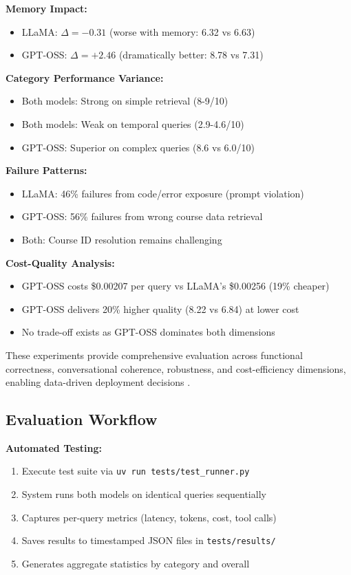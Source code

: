 \documentclass{article}
\begin{document}
\textbf{Memory Impact:}
\begin{itemize}
    \item LLaMA: $\Delta = -0.31$ (worse with memory: 6.32 vs 6.63)
    \item GPT-OSS: $\Delta = +2.46$ (dramatically better: 8.78 vs 7.31)
\end{itemize}

\textbf{Category Performance Variance:}
\begin{itemize}
    \item Both models: Strong on simple retrieval (8-9/10)
    \item Both models: Weak on temporal queries (2.9-4.6/10)
    \item GPT-OSS: Superior on complex queries (8.6 vs 6.0/10)
\end{itemize}

\textbf{Failure Patterns:}
\begin{itemize}
    \item LLaMA: 46\% failures from code/error exposure (prompt violation)
    \item GPT-OSS: 56\% failures from wrong course data retrieval
    \item Both: Course ID resolution remains challenging
\end{itemize}

\textbf{Cost-Quality Analysis:}
\begin{itemize}
    \item GPT-OSS costs \$0.00207 per query vs LLaMA's \$0.00256 (19\% cheaper)
    \item GPT-OSS delivers 20\% higher quality (8.22 vs 6.84) at lower cost
    \item No trade-off exists as GPT-OSS dominates both dimensions
\end{itemize}


These experiments provide comprehensive evaluation across functional correctness, conversational coherence, robustness, and cost-efficiency dimensions, enabling data-driven deployment decisions \cite{anthropic2025multiagent, llmmas2025software}.

\subsection{Evaluation Workflow}

\textbf{Automated Testing:}
\begin{enumerate}
    \item Execute test suite via \texttt{uv run tests/test\_runner.py}
    \item System runs both models on identical queries sequentially
    \item Captures per-query metrics (latency, tokens, cost, tool calls)
    \item Saves results to timestamped JSON files in \texttt{tests/results/}
    \item Generates aggregate statistics by category and overall
\end{enumerate}
\end{document}
